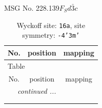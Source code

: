 \documentclass[fleqn,8pt]{jsarticle}
\begin{document}
\setcounter{MaxMatrixCols}{32}

\renewcommand{\tablename}{Table~}
\renewcommand{\figurename}{Figure~}
\begin{center}
\LARGE
MSG No. 228.139\quad$F_{S}d\bar{3}c$
\end{center}
\renewcommand{\arraystretch}{1.2}
\begin{longtable}{ccc}
\caption{Wyckoff site: {\tt 16a}, site symmetry: {\tt -4'3m'}}
 \\
 \hline \hline
No. & position & mapping \\ \hline \endfirsthead

\multicolumn{2}{l}{\tablename\ \thetable{}} \\
 \hline \hline
No. & position & mapping \\ \hline \endhead

 \hline \hline
\multicolumn{2}{r}{\footnotesize\it continued ...} \\ \endfoot

 \hline \hline
\multicolumn{2}{r}{} \\ \endlastfoot


\end{longtable}
\end{document}
